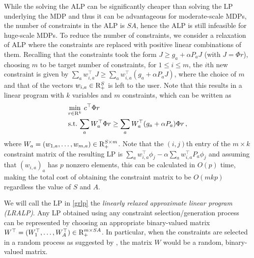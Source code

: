 While the solving the ALP can be significantly cheaper than solving the LP underlying the MDP
and thus it can be advantageous for moderate-scale MDPs,
  the number of constraints in the ALP is $SA$, 
 hence the ALP is still infeasible for huge-scale MDPs. 
To reduce the number of constraints, we consider a relaxation of ALP 
where the constraints are replaced with positive linear 
combinations of them. 
Recalling that the constraints took the form $J \ge g_a + \alpha P_a J$ (with $J = \Phi r$),
choosing $m$ to be target number of constraints, for $1\le i \le m$, the $i$th new constraint is given by
$\sum_a w_{i,a}^\top J \ge \sum_a w_{i,a}^\top(g_a + \alpha P_a J)$, 
where the choice of $m$ and that of the vectors $w_{i,a}\in \mathrm{R}_+^S$ is left to the user.
Note that this results in a linear program with $k$ variables and $m$ constraints, which can be written as
\begin{align}\label{grlp}
\begin{split}
&\underset{r\in \R^k}{\min}\, \, c^\top \Phi r\\
&\text{s.t.}\mb  \,\sum_a W_a^\top \Phi r\geq \sum_a W_a^\top (g_a + \alpha P_a) \Phi r\,,
\end{split}
\end{align}
where $W_a = (w_{1,a},\dots,w_{m,a}) \in \mathrm{R}_+^{S \times m}$. 
Note that the $(i,j)$th entry of the $m\times k$ constraint matrix of the resulting LP is
$\sum_a  w_{i,a}^\top  \phi_j - \alpha \sum_a w_{i,a}^\top P_a \phi_j$ and assuming that $(w_{i,a})_{a}$ has $p$ nonzero
elements, this can be calculated in $O( p )$ time, making the total cost of obtaining the constraint matrix to be $O(mkp)$ regardless the value of $S$ and $A$. 

We will call the LP in \eqref{grlp} the \emph{linearly relaxed approximate linear program (LRALP)}.  Any LP obtained using 
any constraint selection/generation process can be represented by choosing an appropriate binary-valued matrix
$W^\top = (W_1^\top,\dots,W_A^\top)\in \mathrm{R}_+^{m\times SA}$. In particular, when the constraints are selected
in a random process as suggested by \citet{CS}, the matrix $W$ would be a random, binary-valued matrix.

